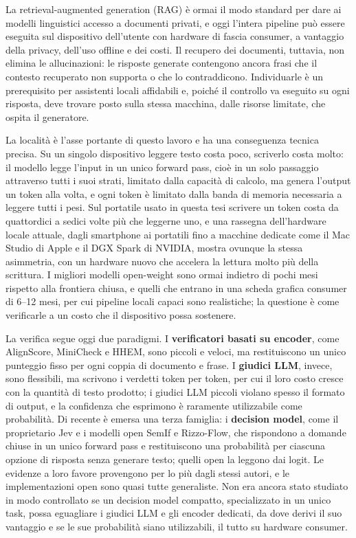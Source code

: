 
La retrieval-augmented generation (RAG) è ormai il modo standard per dare ai modelli linguistici accesso a documenti
privati, e oggi l'intera pipeline può essere eseguita sul dispositivo dell'utente con hardware di fascia consumer, a
vantaggio della privacy, dell'uso offline e dei costi. Il recupero dei documenti, tuttavia, non elimina le allucinazioni:
le risposte generate contengono ancora frasi che il contesto recuperato non supporta o che lo contraddicono. Individuarle
è un prerequisito per assistenti locali affidabili e, poiché il controllo va eseguito su ogni risposta, deve trovare
posto sulla stessa macchina, dalle risorse limitate, che ospita il generatore.

La località è l'asse portante di questo lavoro e ha una conseguenza tecnica precisa. Su un singolo dispositivo leggere
testo costa poco, scriverlo costa molto: il modello legge l'input in un unico forward pass, cioè in un solo passaggio attraverso tutti i suoi strati, limitato
dalla capacità di calcolo, ma genera
l'output un token alla volta, e ogni token è limitato dalla banda di memoria necessaria a leggere tutti i pesi. Sul
portatile usato in questa tesi scrivere un token costa da quattordici a sedici volte più che leggerne uno, e una
rassegna dell'hardware locale attuale, dagli smartphone ai portatili fino a macchine dedicate come il Mac Studio di Apple
e il DGX Spark di NVIDIA, mostra ovunque la stessa asimmetria, con un hardware nuovo che accelera la lettura molto più
della scrittura. I migliori modelli open-weight sono ormai indietro di pochi mesi rispetto alla frontiera chiusa, e quelli che entrano in una scheda grafica consumer di 6--12 mesi, per cui pipeline locali capaci sono realistiche; la questione è come verificarle a un costo che il dispositivo possa sostenere.

La verifica segue oggi due paradigmi. I \textbf{verificatori basati su encoder}, come AlignScore, MiniCheck e HHEM, sono piccoli e
veloci, ma restituiscono un unico punteggio fisso per ogni coppia di documento e frase. I \textbf{giudici LLM}, invece, sono
flessibili, ma scrivono i verdetti token per token, per cui il loro costo cresce con la quantità di testo prodotto; i
giudici LLM piccoli violano spesso il formato di output, e la confidenza che esprimono è raramente utilizzabile come
probabilità. Di recente è emersa una terza famiglia: i \textbf{decision model}, come il proprietario Jev e i modelli
open SemIf e Rizzo-Flow, che rispondono a domande chiuse in un unico forward pass e restituiscono una probabilità per ciascuna opzione di risposta senza generare testo; quelli open la leggono dai logit. Le evidenze a loro favore provengono per lo più dagli stessi autori, e le implementazioni open sono quasi tutte generaliste. Non era ancora stato studiato in modo controllato se un decision model compatto, specializzato in un
unico task, possa eguagliare i giudici LLM e gli encoder dedicati, da dove derivi il suo vantaggio e se le sue
probabilità siano utilizzabili, il tutto su hardware consumer.


